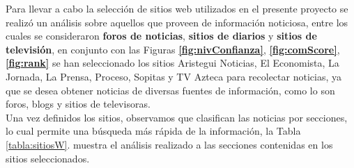 Para llevar a cabo la selección de sitios web utilizados en el presente proyecto se realizó un análisis sobre aquellos que proveen de información noticiosa, entre los cuales se consideraron \textbf{foros de noticias}, \textbf{sitios de diarios} y \textbf{sitios de televisión}, en conjunto con las Figuras \textbf{\ref{fig:nivConfianza}}, \textbf{\ref{fig:comScore}}, \textbf{\ref{fig:rank}} se han seleccionado los sitios Aristegui Noticias, El Economista, La Jornada, La Prensa, Proceso, Sopitas y TV Azteca para recolectar noticias, ya que se desea obtener noticias de diversas fuentes de información, como lo son foros, blogs y sitios de televisoras.\\ 
Una vez definidos los sitios,  observamos que clasifican las noticias por secciones, lo cual permite una búsqueda más rápida de la información, la Tabla \ref{tabla:sitiosW}. muestra el análisis realizado a las secciones contenidas en los sitios seleccionados.
\\

